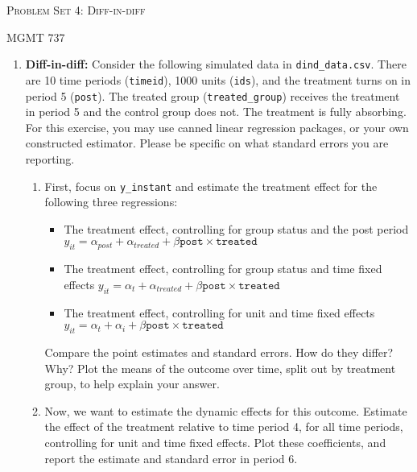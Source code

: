 \documentclass[11pt, a4paper]{article}
\begin{document}
\begin{center}
  {\Large \textsc{Problem Set 4: Diff-in-diff}}

  MGMT 737
\end{center}


\begin{enumerate}
\item \textbf{Diff-in-diff:} Consider the following simulated data in
  \texttt{dind\_data.csv}. There are 10 time periods (\texttt{timeid}),
  1000 units (\texttt{ids}), and the treatment turns on in period 5
  (\texttt{post}). The treated group (\texttt{treated\_group}) receives
  the treatment in period 5 and the control group does not. The
  treatment is fully absorbing. For this exercise, you may use canned
  linear regression packages, or your own constructed
  estimator. Please be specific on what standard errors you are
  reporting. 
  \begin{enumerate}
  \item First, focus on \texttt{y\_instant} and estimate the treatment effect for the following three regressions:
    \begin{itemize}
    \item The treatment effect, controlling for group status and the post period $y_{it} = \alpha_{post} + \alpha_{treated} + \beta \texttt{post} \times \texttt{treated}$
    \item The treatment effect, controlling for group status and time fixed effects $y_{it} = \alpha_{t} + \alpha_{treated} + \beta \texttt{post} \times \texttt{treated}$      
    \item The treatment effect, controlling for unit and time fixed effects $y_{it} = \alpha_{t} + \alpha_{i} + \beta \texttt{post} \times \texttt{treated}$            
    \end{itemize}
    Compare the point estimates and standard errors. How do they differ? Why? Plot the means of the outcome over time, split out by treatment group, to help explain your answer.
  \item Now, we want to estimate the dynamic effects for this
    outcome. Estimate the effect of the treatment relative to time
    period 4, for all time periods, controlling for unit and time
    fixed effects. Plot these coefficients, and report the estimate
    and standard error in period 6.


\end{enumerate}
\end{enumerate}
\end{document}
